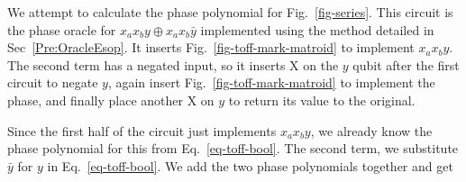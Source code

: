 \begin{example}
  \label{ex-series}
  We attempt to calculate the phase polynomial for Fig.~\ref{fig-series}. This circuit
  is the phase oracle for $x_a x_b y \oplus x_a x_b \bar{y}$ implemented using
  the method detailed in Sec~\ref{Pre:OracleEsop}. It inserts
  Fig.~\ref{fig-toff-mark-matroid} to implement $x_a x_b y$. The second term has a negated
  input, so it inserts X on the $y$ qubit after the first circuit to negate $y$, again
  insert Fig.~\ref{fig-toff-mark-matroid} to implement the phase, and finally place another
  X on $y$ to return its value to the original.

  Since the first half of the circuit just implements $x_a x_b y$, we already know
  the phase polynomial for this from Eq.~\ref{eq-toff-bool}. The second term, we
  substitute $\bar{y}$ for $y$ in Eq.~\ref{eq-toff-bool}. We add the two phase
  polynomials together and get

  \begin{equation}
    \label{eq-series}
    \begin{aligned}
    \end{aligned}
  \end{equation}
\end{example}
